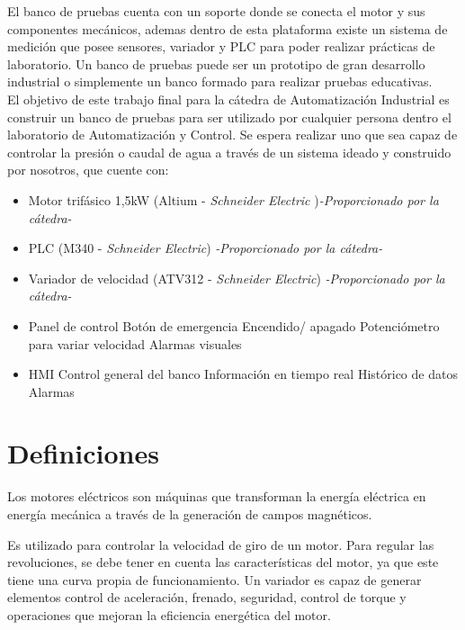El banco de pruebas cuenta con un soporte donde se conecta el motor y sus componentes mecánicos, ademas dentro de esta plataforma existe un sistema de medición que posee sensores, variador y PLC para poder realizar prácticas de laboratorio.
Un banco de pruebas puede ser un prototipo de gran desarrollo industrial o simplemente un banco formado para realizar pruebas educativas. \\

El objetivo de este trabajo final para la cátedra de Automatización Industrial es construir un banco de pruebas para ser utilizado por cualquier persona dentro el laboratorio de Automatización y Control. Se espera realizar uno que sea capaz de controlar la presión o caudal de agua a través de un sistema ideado y construido por nosotros, que cuente con:
\begin{itemize}
    \item Motor trifásico 1,5kW (Altium - \textit{Schneider Electric} )\textit{-Proporcionado por la cátedra-}
    \item PLC (M340 - \textit{Schneider Electric}) \textit{-Proporcionado por la cátedra-}
    \item Variador de velocidad (ATV312 - \textit{Schneider Electric}) \textit{-Proporcionado por la cátedra-}
    \item Panel de control
        \subitem Botón de emergencia
        \subitem Encendido/ apagado
        \subitem Potenciómetro para variar velocidad
        \subitem Alarmas visuales
    \item HMI
        \subitem Control general del banco
        \subitem Información en tiempo real
        \subitem Histórico de datos
        \subitem Alarmas
\end{itemize}


\newpage

\section{Definiciones}
\begin{tcolorbox}[colback=blue!5!white,colframe=blue!75!black,title=Motor eléctrico]
	Los motores eléctricos son máquinas que transforman la energía eléctrica en energía mecánica a través de la generación de campos magnéticos.
\end{tcolorbox}

\begin{tcolorbox}[colback=blue!5!white,colframe=blue!75!black,title=Variador de velocidad]
	Es utilizado para controlar la velocidad de giro de un motor.
	Para regular las revoluciones, se debe tener en cuenta las características del motor, ya que este tiene una curva propia de funcionamiento. Un variador es capaz de generar elementos control de aceleración, frenado, seguridad, control de torque y operaciones que mejoran la eficiencia energética del motor.
\end{tcolorbox}

